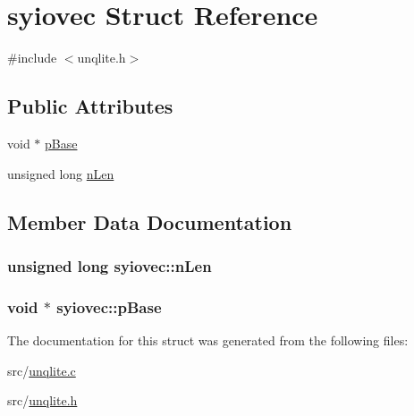 \hypertarget{structsyiovec}{\section{syiovec Struct Reference}
\label{d3/daa/structsyiovec}
}


{\ttfamily \#include $<$unqlite.\-h$>$}

\subsection*{Public Attributes}
\begin{DoxyCompactItemize}
\item 
void $\ast$ \hyperlink{structsyiovec_a39ea369c589d8d413eb2997c1fc07fb2}{p\-Base}
\item 
unsigned long \hyperlink{structsyiovec_a1bf60a73673791b45ef2388bd39337ac}{n\-Len}
\end{DoxyCompactItemize}


\subsection{Member Data Documentation}
\hypertarget{structsyiovec_a1bf60a73673791b45ef2388bd39337ac}{
\subsubsection[{n\-Len}]{\setlength{\rightskip}{0pt plus 5cm}unsigned long syiovec\-::n\-Len}}\label{d3/daa/structsyiovec_a1bf60a73673791b45ef2388bd39337ac}
\hypertarget{structsyiovec_a39ea369c589d8d413eb2997c1fc07fb2}{
\subsubsection[{p\-Base}]{\setlength{\rightskip}{0pt plus 5cm}void $\ast$ syiovec\-::p\-Base}}\label{d3/daa/structsyiovec_a39ea369c589d8d413eb2997c1fc07fb2}


The documentation for this struct was generated from the following files\-:\begin{DoxyCompactItemize}
\item 
src/\hyperlink{unqlite_8c}{unqlite.\-c}\item 
src/\hyperlink{unqlite_8h}{unqlite.\-h}\end{DoxyCompactItemize}
